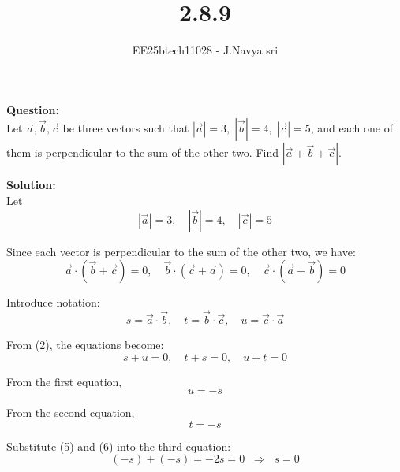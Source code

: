 \documentclass[journal]{IEEEtran}
\begin{document}

\vspace{3cm}

\title{2.8.9}
\author{EE25btech11028 - J.Navya sri}
{\let\newpage\relax\maketitle}


\textbf{Question:} \\
Let $\vec{a}, \vec{b}, \vec{c}$ be three vectors such that 
$|\vec{a}|=3,\; |\vec{b}|=4,\; |\vec{c}|=5$, and each one of them is perpendicular to the sum of the other two. 
Find $|\vec{a}+\vec{b}+\vec{c}|$.

\bigskip

\textbf{Solution:} \\

Let 
\begin{equation}
|\vec{a}|=3,\quad |\vec{b}|=4,\quad |\vec{c}|=5
\end{equation}

Since each vector is perpendicular to the sum of the other two, we have:
\begin{equation}
\vec{a}\cdot(\vec{b}+\vec{c})=0,\quad 
\vec{b}\cdot(\vec{c}+\vec{a})=0,\quad 
\vec{c}\cdot(\vec{a}+\vec{b})=0
\end{equation}

Introduce notation:
\begin{equation}
s=\vec{a}\cdot\vec{b},\quad t=\vec{b}\cdot\vec{c},\quad u=\vec{c}\cdot\vec{a}
\end{equation}

From (2), the equations become:
\begin{equation}
s+u=0,\quad t+s=0,\quad u+t=0
\end{equation}

From the first equation,
\begin{equation}
u=-s
\end{equation}

From the second equation,
\begin{equation}
t=-s
\end{equation}

Substitute (5) and (6) into the third equation:
\begin{equation}
(-s)+(-s)=-2s=0 \;\;\Rightarrow\;\; s=0
\end{equation}
\end{document}
